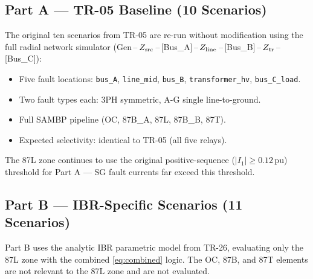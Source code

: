 \documentclass[11pt,a4paper]{article}
\begin{document}
\subsection{Part A — TR-05 Baseline (10 Scenarios)}

The original ten scenarios from TR-05 are re-run without modification using
the full radial network simulator
(Gen\,--\,$Z_{\rm src}$\,--\,[Bus\_A]\,--\,$Z_{\rm line}$\,--\,[Bus\_B]\,--\,$Z_{\rm tr}$\,--\,[Bus\_C]):

\begin{itemize}
  \item Five fault locations: \texttt{bus\_A}, \texttt{line\_mid},
    \texttt{bus\_B}, \texttt{transformer\_hv}, \texttt{bus\_C\_load}.
  \item Two fault types each: 3PH symmetric, A-G single line-to-ground.
  \item Full SAMBP pipeline (OC, 87B\_A, 87L, 87B\_B, 87T).
  \item Expected selectivity: identical to TR-05 (all five relays).
\end{itemize}

The 87L zone continues to use the original positive-sequence
($|I_1| \geq 0.12$\,pu) threshold for Part A — SG fault currents
far exceed this threshold.

\subsection{Part B — IBR-Specific Scenarios (11 Scenarios)}

Part B uses the analytic IBR parametric model from TR-26, evaluating only
the 87L zone with the combined \eqref{eq:combined} logic.  The OC, 87B,
and 87T elements are not relevant to the 87L zone and are not evaluated.
\end{document}
